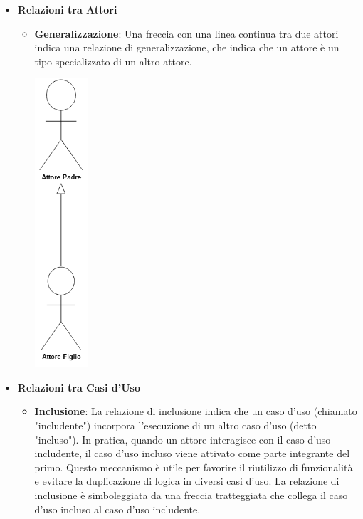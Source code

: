 \begin{itemize}
\begin{itemize}
\begin{center}
		            \end{center}
	      \end{itemize} \newpage
	\item \textbf{Relazioni tra Attori}
	      \begin{itemize}
		      \item \textbf{Generalizzazione}: Una freccia con una linea continua tra due attori indica una relazione di generalizzazione, che indica che un attore è un tipo specializzato di un altro attore.
		            \begin{center}
			            \includegraphics*[width=2cm]{../../../images/norme_di_progetto/generalizzazioneTraAttori.png}
		            \end{center}
	      \end{itemize}
	      \newpage
	\item \textbf{Relazioni tra Casi d'Uso}
	      \begin{itemize}
		      \item \textbf{Inclusione}: La relazione di inclusione indica che un caso d'uso (chiamato "includente") incorpora l'esecuzione di un altro caso d'uso (detto "incluso"). In pratica, quando un attore interagisce con il caso d'uso includente, il caso d'uso incluso viene attivato come parte integrante del primo. Questo meccanismo è utile per favorire il riutilizzo di funzionalità e evitare la duplicazione di logica in diversi casi d'uso. La relazione di inclusione è simboleggiata da una freccia tratteggiata che collega il caso d'uso incluso al caso d'uso includente.

\end{itemize}
\end{itemize}
